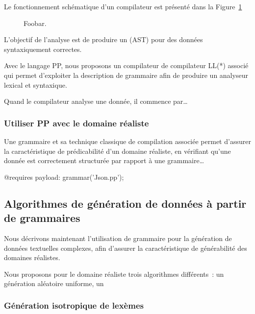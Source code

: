 Le fonctionnement schématique d'un compilateur est présenté dans la
Figure~\ref{figure:data:compiler}
%
\begin{figure}


\caption{\label{figure:data:compiler} Foobar.}

\end{figure}
%

L'objectif de l'analyse est de produire un 
(AST) pour des données syntaxiquement correctes.


Avec le langage PP, nous proposons un compilateur de compilateur LL(*) associé
qui permet d'exploiter la description de grammaire afin de produire un analyseur
lexical et syntaxique.

Quand le compilateur analyse une donnée, il commence par…

\subsubsection{Utiliser PP avec le domaine réaliste }

Une grammaire et sa technique classique de compilation associée permet d'assurer
la caractéristique de prédicabilité d'un domaine réaliste, en vérifiant qu'une
donnée est correctement structurée par rapport à une grammaire…

\begin{pre}
@requires payload: grammar('Json.pp');
\end{pre}

\subsection{Algorithmes de génération de données à partir de grammaires}
\label{subsection:data:algorithms}

Nous décrivons maintenant l'utilisation de grammaire pour la génération de
données textuelles complexes, afin d'assurer la caractéristique de générabilité
des domaines réalistes.

Nous proposons pour le domaine réaliste  trois algorithmes
différents~: un génération aléatoire uniforme, un 

\subsubsection{Génération isotropique de lexèmes}
\label{subsection:data:isotropic_generation}

